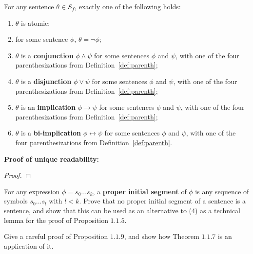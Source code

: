 \begin{proposition}
    For any sentence $\theta \in S_f$, exactly one of the following holds:
    \begin{enumerate}
        \item $\theta$ is atomic;
        \item for some sentence $\phi$, $\theta = \neg \phi$;
        \item $\theta$ is a \textbf{conjunction} $\phi \wedge \psi$ for some sentences $\phi$ and $\psi$, with one of the four parenthesizations from Definition~\ref{def:parenth};
        \item $\theta$ is a \textbf{disjunction} $\phi \vee \psi$ for some sentences $\phi$ and $\psi$, with one of the four parenthesizations from Definition~\ref{def:parenth};
        \item $\theta$ is an \textbf{implication} $\phi \rightarrow \psi$ for some sentences $\phi$ and $\psi$, with one of the four parenthesizations from Definition~\ref{def:parenth};
        \item $\theta$ is a \textbf{bi-implication} $\phi \leftrightarrow \psi$ for some sentences $\phi$ and $\psi$, with one of the four parenthesizations from Definition~\ref{def:parenth}.
    \end{enumerate}
\end{proposition}

\textbf{Proof of unique readability:}
\begin{proof}
    
\end{proof}

\begin{tcolorbox}[title=Problem 11, breakable]
    For any expression $\phi  = s_0 \ldots s_k$, a \textbf{proper initial segment}
    of $\phi$ is any sequence of symbols $s_0 \ldots s_l$ with $l < k$.
    Prove that no proper initial segment of a sentence is a sentence,
        and show that this can be used as an alternative to ($4$) as 
        a technical lemma for the proof of Proposition $1.1.5$.
\end{tcolorbox}

\begin{tcolorbox}[title=Problem 12, breakable]
    Give a careful proof of Proposition $1.1.9$, and show how Theorem $1.1.7$
        is an application of it.
\end{tcolorbox}